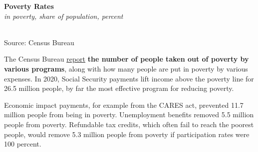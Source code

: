 \documentclass{report}
\makeatletter
\newcommand{\tbllink}[1]{\href{https://raw.githubusercontent.com/bdecon/US-chartbook/master/chartbook/data/#1}{\faTable}}
\newcommand*\short[1]{\expandafter\@gobbletwo\number\numexpr#1\relax}
\newcommand{\absnode}[3]{\node[below right, align=left] at (axis cs: #1,#2) {#3};}
\newcommand{\dateaxisticks}{
		date coordinates in=x, axis line style={draw=none},
		xmax={2022-10-31},
		max space between ticks=40,	    
		xtick={{1990-01-01}, {1992-01-01}, {1994-01-01}, 
			{1996-01-01}, {1998-01-01}, {2000-01-01}, 
			{2002-01-01}, {2004-01-01}, {2006-01-01},
			{2008-01-01}, {2010-01-01}, {2012-01-01}, {2014-01-01},
		    {2016-01-01}, {2018-01-01}, {2020-01-01}, {2022-01-01}, 
		    {2024-01-01}, {2026-01-01}},
		minor xtick={{1989-01-01}, {1991-01-01}, {1993-01-01},
			{1995-01-01}, {1997-01-01}, {1999-01-01}, 
			{2001-01-01}, {2003-01-01}, {2005-01-01}, {2007-01-01},
		    {2009-01-01}, {2011-01-01}, {2013-01-01}, {2015-01-01},
		    {2017-01-01}, {2019-01-01}, {2021-01-01}, {2023-01-01}, 
		    {2025-01-01}, {2027-01-01}},
		enlarge y limits={0.06}, enlarge x limits={0.01},
		}
\newcommand{\bbar}[2]{extra #1 ticks = {{#2}}, extra #1 tick labels = ,
		extra #1 tick style = {grid=major, grid style={thick, black!25}},}
\newcommand{\thickline}[4]{\addplot[ultra thick, no markers, color=#1] 
		table [x=#2, y=#3, col sep=comma] {#4};	}
\newcommand{\rbars}{
		\fill[color=black!10] (axis cs:{1990-07-01},\pgfkeysvalueof{/pgfplots/ymin}) rectangle 
			(axis cs:{1991-03-01}, \pgfkeysvalueof{/pgfplots/ymax});
		\fill[color=black!10] (axis cs:{2007-12-01},\pgfkeysvalueof{/pgfplots/ymin}) rectangle 
			(axis cs:{2009-07-01}, \pgfkeysvalueof{/pgfplots/ymax});
		\fill[color=black!10] (axis cs:{2001-03-01},\pgfkeysvalueof{/pgfplots/ymin}) rectangle 
			(axis cs:{2001-11-01}, \pgfkeysvalueof{/pgfplots/ymax});
		\fill[color=black!10] (axis cs:{2020-02-01},\pgfkeysvalueof{/pgfplots/ymin}) rectangle 
			(axis cs:{2020-05-01}, \pgfkeysvalueof{/pgfplots/ymax});}
\makeatother
\begin{document}
{\begin{minipage}{0.76\textwidth}
\small 
\vspace{1mm}

\normalsize \textbf{Poverty Rates}\\
\footnotesize{\textit{in poverty, share of population, percent}}\\
\hspace*{-2mm} \\
\footnotesize{Source: Census Bureau} \hfill \tbllink{poverty_opm_line.csv}
\end{minipage}
\newpage
\begin{minipage}{0.76\textwidth}
\small The Census Bureau \href{https://www.census.gov/library/publications/2021/demo/p60-275.html}{report} \textbf{the number of people taken out of poverty by various programs}, along with how many people are put in poverty by various expenses. In 2020, Social Security payments lift income above the poverty line for 26.5 million people, by far the most effective program for reducing poverty.

Economic impact payments, for example from the CARES act, prevented 11.7 million people from being in poverty. Unemployment benefits removed 5.5 million people from poverty. Refundable tax credits, which often fail to reach the poorest people, would remove 5.3 million people from poverty if participation rates were 100 percent. 


\end{minipage}}
\end{document}
